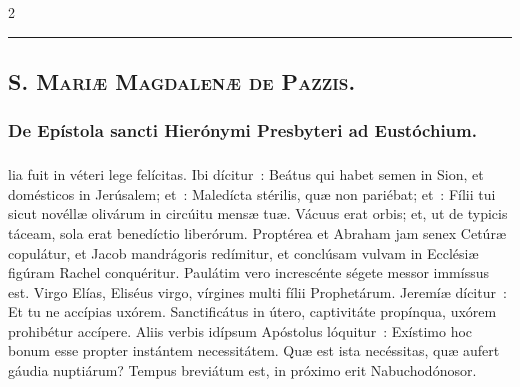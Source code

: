 \documentclass[9pt,twoside]{extarticle}
\begin{document}
\begin{multicols}{2}
{{\begin{center}\textcolor{red}{\rule{\linewidth}{0.5pt}} \end{center}

\subsubsection*{\center {}}
\subsection*{\center \textsc{S. Mariæ Magdalenæ de Pazzis.}}
\subsubsection*{\center {}}
\subsubsection*{\center De Epístola sancti Hierónymi Presbyteri ad Eustóchium.}
\subsubsection*{\center {}}
lia fuit in véteri lege felícitas. Ibi dícitur~: Beátus qui habet semen in Sion, et domésticos in Jerúsalem; et~: Maledícta stérilis, quæ non pariébat; et~: Fílii tui sicut novéllæ olivárum in circúitu mensæ tuæ. Vácuus erat orbis; et, ut de typicis táceam, sola erat benedíctio liberórum. Proptérea et Abraham jam senex Cetúræ copulátur, et Jacob mandrágoris redímitur, et conclúsam vulvam in Ecclésiæ figúram Rachel conquéritur. Paulátim vero increscénte ségete messor immíssus est. Virgo Elías, Eliséus virgo, vírgines multi fílii Prophetárum. Jeremíæ dícitur~: Et tu ne accípias uxórem. Sanctificátus in útero, captivitáte propínqua, uxórem prohibétur accípere. Aliis verbis idípsum Apóstolus lóquitur~: Exístimo hoc bonum esse propter instántem necessitátem. Quæ est ista necéssitas, quæ aufert gáudia nuptiárum? Tempus breviátum est, in próximo erit Nabuchodónosor.

\begin{tightlist}{}
\item {}
\item {}
\end{tightlist}

}}
\end{multicols}
\end{document}
